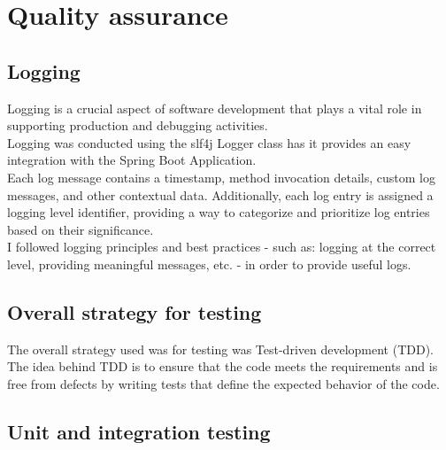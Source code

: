 \documentclass[12pt]{article}
\begin{document}
\section{Quality assurance}

\subsection{Logging}

Logging is a crucial aspect of software development that plays a vital role in supporting production and debugging activities. \\
Logging was conducted using the slf4j Logger class has it provides an easy integration with the Spring Boot Application.\\
Each log message contains a timestamp, method invocation details, custom log messages, and other contextual data. Additionally, each log entry is assigned a logging level identifier, providing a way to categorize and prioritize log entries based on their significance.\\
I followed logging principles and best practices - such as: logging at the correct level, providing meaningful messages, etc. - in order to provide useful logs.

\subsection{Overall strategy for testing}

The overall strategy used was for testing was Test-driven development (TDD). The idea behind TDD is to ensure that the code meets the requirements and is free from defects by writing tests that define the expected behavior of the code. 

\subsection{Unit and integration testing}
\end{document}

